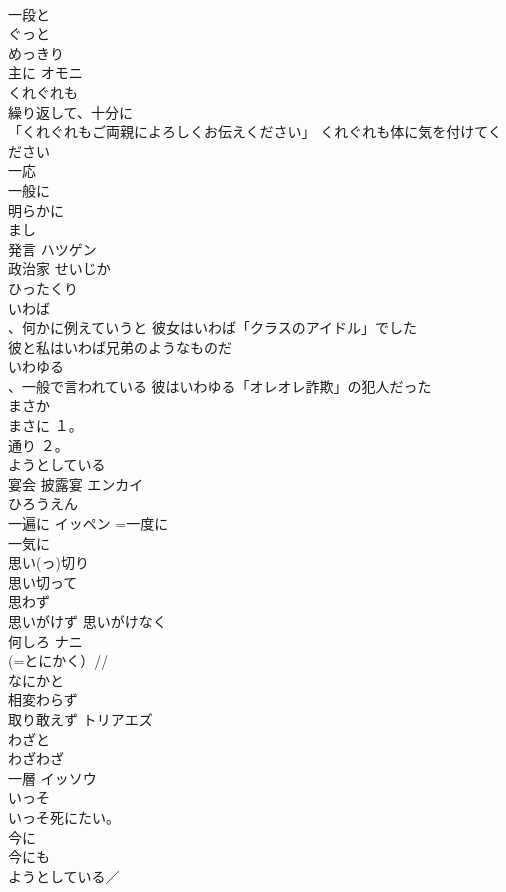\documentclass[8pt]{extreport}
\begin{document}
\begin{CJK}{UTF8}{min}
\\	一段と	
\\	ぐっと	
\\	めっきり	
\\	主に	オモニ 
\\	くれぐれも	
\\	繰り返して、十分に
\\	「くれぐれもご両親によろしくお伝えください」 くれぐれも体に気を付けてください
\\	一応	
\\	一般に	
\\	明らかに	
\\	まし	
\\	発言	ハツゲン 
\\	政治家	せいじか 
\\	ひったくり	
\\	いわば	
\\	、何かに例えていうと 彼女はいわば「クラスのアイドル」でした 
\\	彼と私はいわば兄弟のようなものだ 
\\	いわゆる	
\\	、一般で言われている 彼はいわゆる「オレオレ詐欺」の犯人だった 
\\	まさか	
\\	まさに	１。
\\	通り ２。
\\	ようとしている
\\	宴会 披露宴	エンカイ 
\\	ひろうえん
\\	一遍に	イッペン =一度に 
\\	一気に	
\\	思い(っ)切り	
\\	思い切って	
\\	思わず	
\\	思いがけず 思いがけなく	
\\	何しろ	ナニ 
\\	(=とにかく）//
\\	なにかと	
\\	相変わらず	
\\	取り敢えず	トリアエズ 
\\	わざと	
\\	わざわざ	
\\	一層	イッソウ 
\\	いっそ	
\\	いっそ死にたい。
\\	今に	
\\	今にも 
\\	ようとしている／

\end{CJK}
\end{document}
